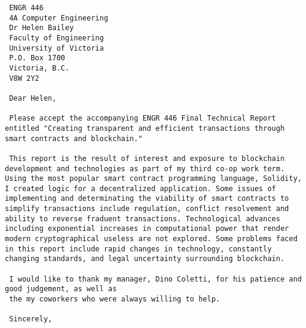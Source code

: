  \linespread{1}
 \begin{verbatim}
 ENGR 446
 4A Computer Engineering 
 Dr Helen Bailey
 Faculty of Engineering
 University of Victoria
 P.O. Box 1700
 Victoria, B.C.
 V8W 2Y2
 
 Dear Helen, 
 
 Please accept the accompanying ENGR 446 Final Technical Report entitled "Creating transparent and efficient transactions through smart contracts and blockchain."
 
 This report is the result of interest and exposure to blockchain development and technologies as part of my third co-op work term. Using the most popular smart contract programming language, Solidity, I created logic for a decentralized application. Some issues of implementing and determinating the viability of smart contracts to simplify transactions include regulation, conflict resolvement and ability to reverse fraduent transactions. Technological advances including exponential increases in computational power that render modern cryptographical useless are not explored. Some problems faced in this report include rapid changes in technology, constantly changing standards, and legal uncertainty surrounding blockchain.
 
 I would like to thank my manager, Dino Coletti, for his patience and good judgement, as well as
 the my coworkers who were always willing to help.
 
 Sincerely,

 \end{verbatim}
 \fancyhf{} %
